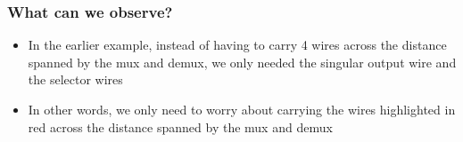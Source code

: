 \documentclass{beamer}
\begin{document}
    	\begin{frame}
    		\frametitle{What can we observe?}
    		\begin{itemize}
    			\item In the earlier example, instead of having to carry 4 wires across the distance spanned by the mux and demux, we only needed the singular output wire and the selector wires
    			\item In other words, we only need to worry about carrying the wires highlighted in red across the distance spanned by the mux and demux
    		\end{itemize}
    		
    		


\begin{tikzpicture}[x=0.75pt,y=0.75pt,yscale=-1,xscale=1]


\end{tikzpicture}
\end{frame}
\end{document}
